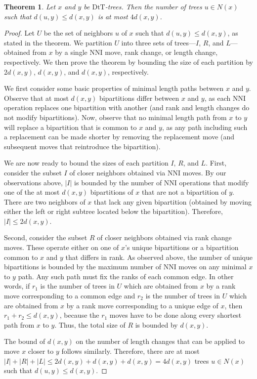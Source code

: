\documentclass{amsart}
\newtheorem{theorem}[lemma]{Theorem}
\newcommand{\dts}{\mathrm{DtT}}
\begin{document}
\begin{theorem}
\label{max_good_neighbors}
Let $x$ and $y$ be $\dts$-trees.
Then the number of trees $u \in N(x)$ such that $d(u, y) \le d(x, y)$ is at most $4d(x,y)$.
\end{theorem}
\begin{proof}
Let $U$ be the set of neighbors $u$ of $x$ such that $d(u,y) \le d(x,y)$, as stated in the theorem.
We partition $U$ into three sets of trees---$I$, $R$, and $L$---obtained from $x$ by a single NNI move, rank change, or length change, respectively.
We then prove the theorem by bounding the size of each partition by $2d(x,y)$, $d(x,y)$, and $d(x,y)$, respectively.

We first consider some basic properties of minimal length paths between $x$ and $y$.  
Observe that at most $d(x,y)$ bipartitions differ between $x$ and $y$, as each NNI operation replaces one bipartition with another (and rank and length changes do not modify bipartitions).
Now, observe that no minimal length path from $x$ to $y$ will replace a bipartition that is common to $x$ and $y$, as any path including such a replacement can be made shorter by removing the replacement move (and subsequent moves that reintroduce the bipartition).

We are now ready to bound the sizes of each partition $I$, $R$, and $L$.
First, consider the subset $I$ of closer neighbors obtained via NNI moves.
By our observations above, $|I|$ is bounded by the number of NNI operations that modify one of the at most $d(x,y)$ bipartitions of $x$ that are not a bipartition of $y$.
There are two neighbors of $x$ that lack any given bipartition (obtained by moving either the left or right subtree located below the bipartition).
Therefore, $|I| \le 2d(x,y)$.

Second, consider the subset $R$ of closer neighbors obtained via rank change moves.
These operate either on one of $x$'s unique bipartitions or a bipartition common to $x$ and $y$ that differs in rank.
As observed above, the number of unique bipartitions is bounded by the maximum number of NNI moves on any minimal $x$ to $y$ path.
Any such path must fix the ranks of each common edge.
In other words, if $r_1$ is the number of trees in $U$ which are obtained from $x$ by a rank move corresponding to a common edge and $r_2$ is the number of trees in $U$ which are obtained from $x$ by a rank move corresponding to a unique edge of $x$, then $r_1 + r_2 \leq d(x,y)$, because the $r_1$ moves have to be done along every shortest path from $x$ to $y$. 
Thus, the total size of $R$ is bounded by $d(x,y)$.

The bound of $d(x,y)$ on the number of length changes that can be applied to move $x$ closer to $y$ follows similarly.
Therefore, there are at most $|I| + |R| + |L| \le 2d(x,y) + d(x,y) + d(x,y) = 4d(x,y)$ trees $u \in N(x)$ such that $d(u, y) \le d(x, y)$. 
\end{proof}
\end{document}
